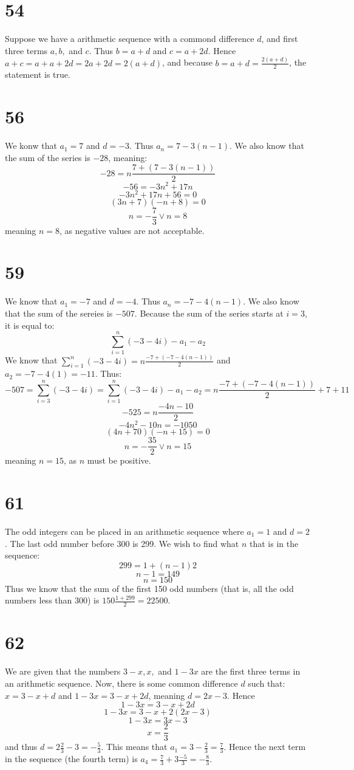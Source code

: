\documentclass{article}
\theoremstyle{definition}
\newcommand{\?}{\stackrel{?}{=}}
\begin{document}
\section*{54}
Suppose we have a arithmetic sequence with a commond difference $d$, and first three terms $a,b,$ and $c$. Thus $b=a+d$ and $c=a+2d$. Hence $a+c=a+a+2d=2a+2d=2(a+d)$, and because 
$b=a+d=\frac{2(a+d)}{2}$, the statement is true.

\section*{56}
We konw that $a_1=7$ and $d=-3$. Thus $a_n=7-3(n-1)$. We also know that the sum of the series is $-28$, meaning:
\[ -28=n\frac{7+(7-3(n-1))}{2} \] \[ -56=-3n^2+17n \] \[ -3n^2+17n+56=0 \] \[ (3n+7)(-n+8)=0 \] \[ n=-\frac{7}{3}\vee n=8 \] meaning $n=8$, as negative values are not acceptable.

\section*{59}
We know that $a_1=-7$ and $d=-4$. Thus $a_n=-7-4(n-1)$. We also know that the sum of the sereies is $-507$. Because the sum of the series starts at $i=3$, it is equal to:
\[ \sum_{i=1}^n(-3-4i)-a_1-a_2 \] We know that $\sum_{i=1}^n(-3-4i)=n\frac{-7+(-7-4(n-1))}{2}$ and $a_2=-7-4(1)=-11$. Thus:
\[ -507=\sum_{i=3}^n(-3-4i)=\sum_{i=1}^n(-3-4i)-a_1-a_2=n\frac{-7+(-7-4(n-1))}{2}+7+11 \]
\[ -525=n\frac{-4n-10}{2} \] \[ -4n^2-10n=-1050 \] \[ (4n+70)(-n+15)=0 \] \[ n=-\frac{35}{2}\vee n=15 \] meaning $n=15$, as $n$ must be positive.

\section*{61}
The odd integers can be placed in an arithmetic sequence where $a_1=1$ and $d=2$. The last odd number before 300 is 299. We wish to find what $n$ that is in the sequence:
\[ 299=1+(n-1)2 \] \[ n-1=149 \] \[ n=150 \] Thus we know that the sum of the first 150 odd numbers (that is, all the odd numbers less than 300) is $150\frac{1+299}{2}=22500$. 

\section*{62}
We are given that the numbers $3-x,x,$ and $1-3x$ are the first three terms in an arithmetic sequence. Now, there is some common difference $d$ such that:
$x=3-x+d$ and $1-3x=3-x+2d$, meaning $d=2x-3$. Hence \[ 1-3x=3-x+2d \] \[ 1-3x=3-x+2(2x-3) \] \[ 1-3x=3x-3 \] \[ x=\frac{2}{3} \]
and thus $d=2\frac{2}{3}-3=-\frac{5}{3}$. This means that $a_1=3-\frac{2}{3}=\frac{7}{3}$. Hence the next term in the sequence (the fourth term) is $a_4=\frac{7}{3}+3\frac{-5}{3}=-\frac{8}{3}$.
\end{document}
